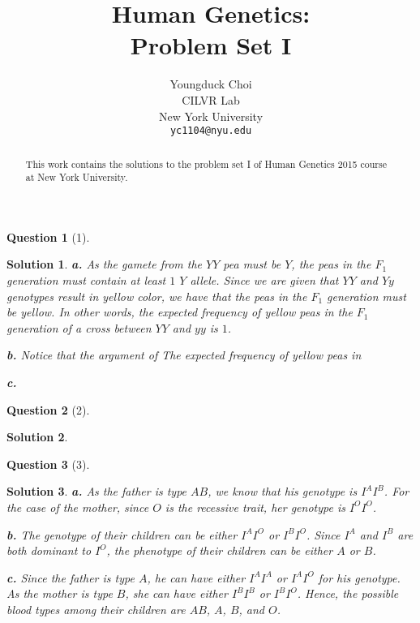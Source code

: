\documentclass{article} %
\title{Human Genetics: \\
Problem Set I}
\author{
Youngduck Choi \\
CILVR Lab \\
New York University\\
\texttt{yc1104@nyu.edu} \\
}
\theoremstyle{quest}
\newtheorem*{question}{Question}
\newtheorem*{solution}{Solution}
\begin{document}
\maketitle

\begin{abstract}
This work contains the solutions to the problem set I
of Human Genetics 2015 course at New York University.
\end{abstract}

\begin{question}[1] 
\end{question}

\smallskip

\begin{solution}
\textbf{a.} As the gamete from the $YY$ pea must be $Y$, the peas in the $F_1$ generation
must contain at least $1$ $Y$ allele. Since we are given that $YY$ and $Yy$ genotypes result
in yellow color, we have that the peas in the $F_1$ generation must be yellow. In other words,
the expected frequency of yellow peas in the $F_1$ generation of a cross between $YY$ and $yy$
is $1$.

\smallskip

\textbf{b.} Notice that the argument of 
The expected frequency of yellow peas in 

\smallskip

\textbf{c.}

\smallskip

\end{solution}

\bigskip


\begin{question}[2]
\end{question}
\begin{solution}
\end{solution}

\bigskip

\begin{question}[3]
\end{question}
\begin{solution}
\textbf{a.} As the father is type $AB$, we know that his genotype is $I^A I^B$. For the case of the mother,
since $O$ is the recessive trait, her genotype is $I^O I^O$. \\

\smallskip

\textbf{b.} The genotype of their children can be either $I^A I^O$ or $I^B I^O$. Since 
$I^A$ and $I^B$ are both dominant to $I^O$, the phenotype of their children can be
either $A$ or $B$.

\smallskip

\textbf{c.} Since the father is type $A$, he can have either $I^A I^A$ or $I^A I^O$ 
for his genotype. As the mother is type $B$, she can have either $I^B I^B$ or $I^B I^O$.
Hence, the possible blood types among their children are $AB$, $A$, $B$, and $O$.


\end{solution}
\end{document}

